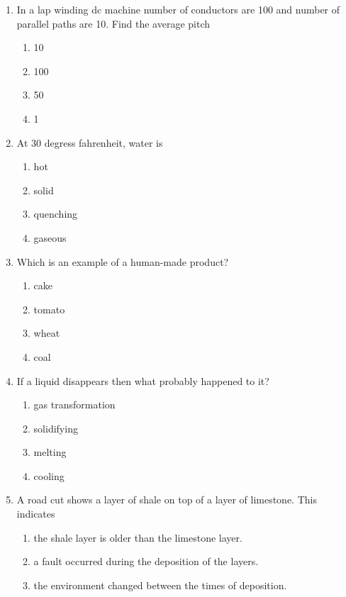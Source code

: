 \documentclass[12pt]{article}
\begin{document}
\begin{enumerate}[label=\arabic*.]
\begin{enumerate}[label=(\alph*)]
    \item Fall
    \item Winter
    \item Summer
    \item Spring
\end{enumerate}
\item In a lap winding dc machine number of conductors are 100 and number of parallel paths are 10. Find the average pitch
\begin{enumerate}[label=(\alph*)]
    \item 10
    \item 100
    \item 50
    \item 1
\end{enumerate}
\item At 30 degress fahrenheit, water is
\begin{enumerate}[label=(\alph*)]
    \item hot
    \item solid
    \item quenching
    \item gaseous
\end{enumerate}
\item Which is an example of a human-made product?
\begin{enumerate}[label=(\alph*)]
    \item cake
    \item tomato
    \item wheat
    \item coal
\end{enumerate}
\item If a liquid disappears then what probably happened to it?
\begin{enumerate}[label=(\alph*)]
    \item gas transformation
    \item solidifying
    \item melting
    \item cooling
\end{enumerate}
\item A road cut shows a layer of shale on top of a layer of limestone. This indicates
\begin{enumerate}[label=(\alph*)]
    \item the shale layer is older than the limestone layer.
    \item a fault occurred during the deposition of the layers.
    \item the environment changed between the times of deposition.

\end{enumerate}
\end{enumerate}
\end{document}
